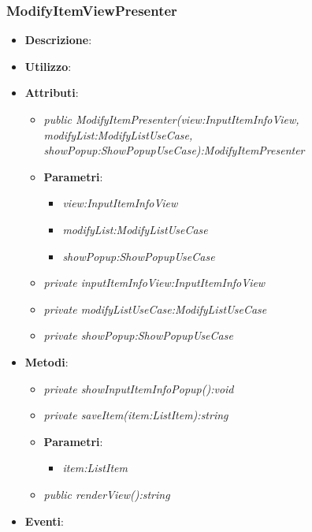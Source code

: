 \subsubsection{ModifyItemViewPresenter}
\begin{itemize}
\item \textbf{Descrizione}: 
\item \textbf{Utilizzo}:
\item \textbf{Attributi}: 
	\begin{itemize}
	\item \textit{public ModifyItemPresenter(view:InputItemInfoView, modifyList:ModifyListUseCase, showPopup:ShowPopupUseCase):ModifyItemPresenter}\\
	
		\item{\textbf{Parametri}: \begin{itemize}
		\item \textit{view:InputItemInfoView}\\
		
		\item \textit{modifyList:ModifyListUseCase}\\
		
		\item \textit{showPopup:ShowPopupUseCase}\\

		\end{itemize}}
	\item \textit{private inputItemInfoView:InputItemInfoView}\\
	
	\item \textit{private modifyListUseCase:ModifyListUseCase}\\
	
	\item \textit{private showPopup:ShowPopupUseCase}\\
	
	\end{itemize}
\item \textbf{Metodi}:
	\begin{itemize}
	\item \textit{private showInputItemInfoPopup():void}\\

	\item \textit{private saveItem(item:ListItem):string}\\

			\item{\textbf{Parametri}: \begin{itemize}
			\item \textit{item:ListItem}\\

			\end{itemize}}
	\item \textit{public renderView():string}\\

	\end{itemize}
\item \textbf{Eventi}:
\end{itemize}